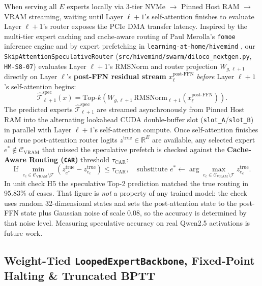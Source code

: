 \documentclass[11pt,a4paper]{article}
\begin{document}
When serving all $E$ experts locally via 3-tier NVMe $\to$ Pinned Host RAM $\to$ VRAM streaming, waiting until Layer $\ell+1$'s self-attention finishes to evaluate Layer $\ell+1$'s router exposes the PCIe DMA transfer latency. Inspired by the multi-tier expert caching and cache-aware routing of Paul Merolla's \texttt{fomoe} inference engine \cite{merolla2025fomoe} and by expert prefetching in \texttt{learning-at-home/hivemind} \cite{ryabinin2020hivemind}, our \texttt{SkipAttentionSpeculativeRouter} (\texttt{src/hivemind/swarm/diloco\_nextgen.py}, \texttt{HM-S8-07}) evaluates Layer $\ell+1$'s RMSNorm and router projection $W_{g, \ell+1}$ directly on Layer $\ell$'s \textbf{post-FFN residual stream} $x_{\ell}^{\text{post-FFN}}$ \textit{before} Layer $\ell+1$'s self-attention begins:
\begin{equation}
    \hat{\mathcal{T}}_{\ell+1}^{\text{spec}}(x) = \text{Top-}k\!\left( W_{g, \ell+1} \, \text{RMSNorm}_{\ell+1}\!\left(x_{\ell}^{\text{post-FFN}}\right) \right).
\end{equation}
The predicted experts $\hat{\mathcal{T}}_{\ell+1}^{\text{spec}}$ are streamed asynchronously from Pinned Host RAM into the alternating lookahead CUDA double-buffer slot (\texttt{slot\_A}/\texttt{slot\_B}) in parallel with Layer $\ell+1$'s self-attention compute. Once self-attention finishes and true post-attention router logits $z^{\text{true}} \in \mathbb{R}^E$ are available, any selected expert $e^* \notin \mathcal{C}_{\text{VRAM}}$ that missed the speculative prefetch is checked against the \textbf{Cache-Aware Routing (\texttt{CAR})} threshold $\tau_{\text{CAR}}$:
\begin{equation}
    \text{If } \min_{e_c \in \mathcal{C}_{\text{VRAM}} \setminus \mathcal{T}} \left( z^{\text{true}}_{e^*} - z^{\text{true}}_{e_c} \right) \le \tau_{\text{CAR}}, \quad \text{substitute } e^* \leftarrow \arg\max_{e_c \in \mathcal{C}_{\text{VRAM}} \setminus \mathcal{T}} z^{\text{true}}_{e_c}.
\end{equation}
In unit check H5 the speculative Top-2 prediction matched the true routing in 95.83\% of cases. That figure is \emph{not} a property of any trained model: the check uses random 32-dimensional states and sets the post-attention state to the post-FFN state plus Gaussian noise of scale 0.08, so the accuracy is determined by that noise level. Measuring speculative accuracy on real Qwen2.5 activations is future work.

\subsection{Weight-Tied \texttt{LoopedExpertBackbone}, Fixed-Point Halting \& Truncated BPTT}
\end{document}
